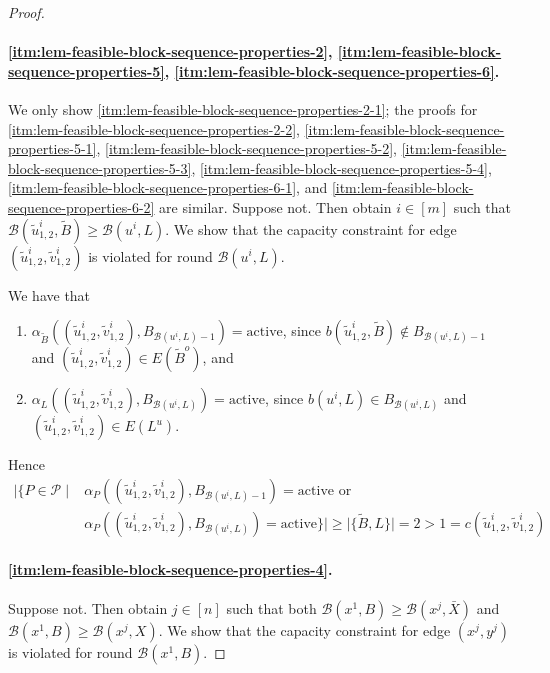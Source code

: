 \documentclass[fontsize=11pt,paper=a4]{book}
\begin{document}
\begin{proof}
\paragraph{\ref{itm:lem-feasible-block-sequence-properties-2}, \ref{itm:lem-feasible-block-sequence-properties-5}, \ref{itm:lem-feasible-block-sequence-properties-6}.}
We only show \ref{itm:lem-feasible-block-sequence-properties-2-1}; the proofs for \ref{itm:lem-feasible-block-sequence-properties-2-2}, \ref{itm:lem-feasible-block-sequence-properties-5-1}, \ref{itm:lem-feasible-block-sequence-properties-5-2}, \ref{itm:lem-feasible-block-sequence-properties-5-3}, \ref{itm:lem-feasible-block-sequence-properties-5-4}, \ref{itm:lem-feasible-block-sequence-properties-6-1}, and \ref{itm:lem-feasible-block-sequence-properties-6-2} are similar.
Suppose not.
Then obtain \(i\in[m]\) such that \(\mathcal{B}(\tilde{u}_{1,2}^i,\tilde{B})\geq\mathcal{B}(u^i,L)\).
We show that the capacity constraint for edge \((\tilde{u}_{1,2}^i,\tilde{v}_{1,2}^i)\) is violated for round \(\mathcal{B}(u^i,L)\).

We have that

\begin{enumerate}
\item \(\alpha_{\tilde{B}}((\tilde{u}_{1,2}^i,\tilde{v}_{1,2}^i),B_{\mathcal{B}(u^i,L)-1})=\mathrm{active}\), since \(b(\tilde{u}_{1,2}^i,\tilde{B})\notin B_{\mathcal{B}(u^i,L)-1}\) and \((\tilde{u}_{1,2}^i,\tilde{v}_{1,2}^i)\in E(\tilde{B}^o)\), and

\item \(\alpha_L((\tilde{u}_{1,2}^i,\tilde{v}_{1,2}^i),B_{\mathcal{B}(u^i,L)})=\mathrm{active}\), since \(b(u^i,L)\in B_{\mathcal{B}(u^i,L)}\) and \((\tilde{u}_{1,2}^i,\tilde{v}_{1,2}^i)\in E(L^u)\).
\end{enumerate}

Hence
\begin{align*}
\lvert\{P\in\mathcal{P}\mid&\alpha_P((\tilde{u}_{1,2}^i,\tilde{v}_{1,2}^i),B_{\mathcal{B}(u^i,L)-1})=\mathrm{active}\text{ or }\\
&\alpha_P((\tilde{u}_{1,2}^i,\tilde{v}_{1,2}^i),B_{\mathcal{B}(u^i,L)})=\mathrm{active}\}\rvert\geq\lvert\{\tilde{B},L\}\rvert=2>1=c(\tilde{u}_{1,2}^i,\tilde{v}_{1,2}^i)
\end{align*}

\paragraph{\ref{itm:lem-feasible-block-sequence-properties-4}.}
Suppose not.
Then obtain \(j\in[n]\) such that both \(\mathcal{B}(x^1,B)\geq\mathcal{B}(x^j,\bar{X})\) and \(\mathcal{B}(x^1,B)\geq\mathcal{B}(x^j,X)\).
We show that the capacity constraint for edge \((x^j,y^j)\) is violated for round \(\mathcal{B}(x^1,B)\).


\end{proof}
\end{document}
